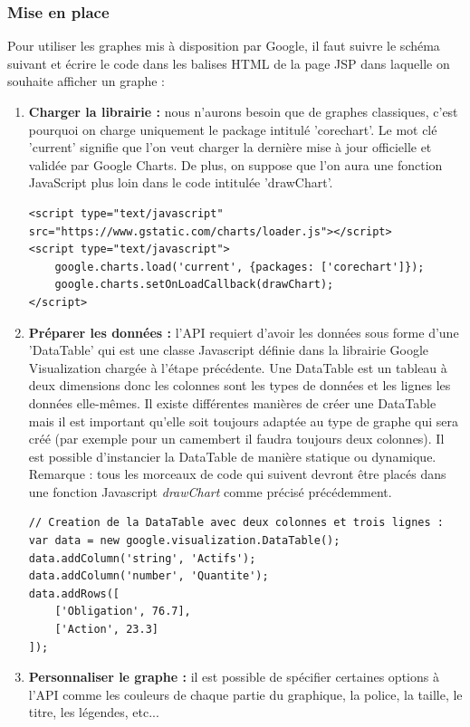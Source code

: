 \subsubsection{Mise en place}
Pour utiliser les graphes mis à disposition par Google, il faut suivre le schéma suivant et écrire le code dans les balises HTML de la page JSP dans laquelle on souhaite afficher un graphe :
\begin{enumerate}
 \item \textbf{Charger la librairie :} nous n'aurons besoin que de graphes classiques, c'est pourquoi on charge uniquement le package intitulé 'corechart'. Le mot clé 'current' signifie que l'on veut charger la dernière mise à jour officielle et validée par Google Charts. De plus, on suppose que l'on aura une fonction JavaScript plus loin dans le code intitulée 'drawChart'.
\begin{lstlisting}
<script type="text/javascript" src="https://www.gstatic.com/charts/loader.js"></script>
<script type="text/javascript">
    google.charts.load('current', {packages: ['corechart']});
    google.charts.setOnLoadCallback(drawChart);
</script>
\end{lstlisting}
 \item \textbf{Préparer les données :} l'API requiert d'avoir les données sous forme d'une 'DataTable' qui est une classe Javascript définie dans la librairie Google Visualization chargée à l'étape précédente. Une DataTable est un tableau à deux dimensions donc les colonnes sont les types de données et les lignes les données elle-mêmes. Il existe différentes manières de créer une DataTable mais il est important qu'elle soit toujours adaptée au type de graphe qui sera créé (par exemple pour un camembert il faudra toujours deux colonnes). Il est possible d'instancier la DataTable de manière statique ou dynamique. Remarque : tous les morceaux de code qui suivent devront être placés dans une fonction Javascript \textit{drawChart} comme précisé précédemment.
\begin{lstlisting}
// Creation de la DataTable avec deux colonnes et trois lignes :
var data = new google.visualization.DataTable();
data.addColumn('string', 'Actifs');
data.addColumn('number', 'Quantite');
data.addRows([
    ['Obligation', 76.7],
    ['Action', 23.3]
]);
\end{lstlisting}
 \item \textbf{Personnaliser le graphe :} il est possible de spécifier certaines options à l'API comme les couleurs de chaque partie du graphique, la police, la taille, le titre, les légendes, etc...

\end{enumerate}
